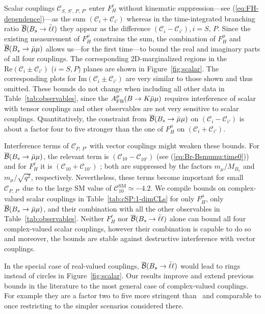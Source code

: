 \documentclass[twocolumn,epjc3]{svjour3}
\numberwithin{equation}{section}
\def \refeq#1{(\ref{#1})}
\def \reffig#1{Figure~\ref{#1}}
\def \reftab#1{Table~\ref{#1}}
\newcommand{\wilson}[2][{}]{\mathcal{C}_{#2}^{\mathrm{#1}}}
\renewcommand{\[}{\big[}
\renewcommand{\]}{\big]}
\renewcommand{\(}{\big(}
\renewcommand{\)}{\big)}
\begin{document}
Scalar couplings $\wilson{S,\, S',\, P,\, P'}$ enter $F_H^\ell$
without kinematic suppression---see \refeq{eq:FH-dependence}---as the
sum $(\wilson{i} + \wilson{i'})$ whereas in the time-integrated
branching ratio $\overline{\cal B}(B_s\to \bar\ell\ell)$ they appear
as the difference $(\wilson{i} - \wilson{i'}), i = S,\, P$.  Since the
existing measurement of $F_H^\mu$ constrains the sum, the combination
of $F_H^\mu$ and $\overline{\cal B}(B_s \to \bar\mu\mu)$ allows
us---for the first time---to bound the real and imaginary parts of all
four couplings.  The corresponding 2D-marginalized regions in the
$\mbox{Re}(\wilson{i} \pm \wilson{i'})$ ($i = S, P$) planes are shown
in \reffig{fig:scalar}. The corresponding plots for
$\mbox{Im}(\wilson{i} \pm \wilson{i'})$ are very similar to those
shown and thus omitted. These bounds do not change when including all
other data in \reftab{tab:observables}, since the $A_{\rm FB}^\mu(B\to
K\bar\mu\mu)$ requires interference of scalar with tensor couplings
and other observables are not very sensitive to scalar
couplings. Quantitatively, the constraint from $\overline{\cal B} (B_s
\to \bar\mu\mu)$ on $(\wilson{i} - \wilson{i'})$ is about a factor
four to five stronger than the one of $F_H^\mu$ on $(\wilson{i} +
\wilson{i'})$.

Interference terms of $\wilson{P,\,P'}$ with vector couplings might weaken these
bounds. For $\overline{\cal B}(B_s \to \bar\mu\mu)$, the relevant term is
$(\wilson{10} - \wilson{10'})$ (see \refeq{eq:Br-Bsmumu:time0}) and for
$F_H^\ell$ it is $(\wilson{10} + \wilson{10'})$ \cite{Bobeth:2007dw}; both are
suppressed by the factors $m_\mu/M_{B_s}$ and $m_\mu/\sqrt{q^2}$,
respectively. Nevertheless, these terms become important for small
$\wilson{P,\,P'}$ due to the large SM value of $\wilson[SM]{10} \simeq -4.2$. We
compile bounds on complex-valued scalar couplings in \reftab{tab:cSP:1-dimCLs}
for only $F_H^\mu$, only $\overline{\cal B}(B_s \to \bar\mu\mu)$, and their
combination with all the other observables in \reftab{tab:observables}. Neither
$F_H^\ell$ nor $\overline{\cal B}(B_s \to \bar\ell\ell)$ alone can bound all
four complex-valued scalar couplings, however their combination is capable to do
so and moreover, the bounds are stable against destructive interference with
vector couplings.

In the special case of real-valued couplings, $\overline{\cal B}(B_s \to
\bar\ell\ell)$ would lead to rings~\cite{Alonso:2014csa} instead of circles in \reffig{fig:scalar}.
Our results improve and extend previous bounds in the literature to the most
general case of complex-valued couplings. For example they are a factor two to
five more stringent than~\cite{Becirevic:2012fy} and comparable to
\cite{Altmannshofer:2012az} once restricting to the simpler scenarios considered
there.
%
%
\end{document}
